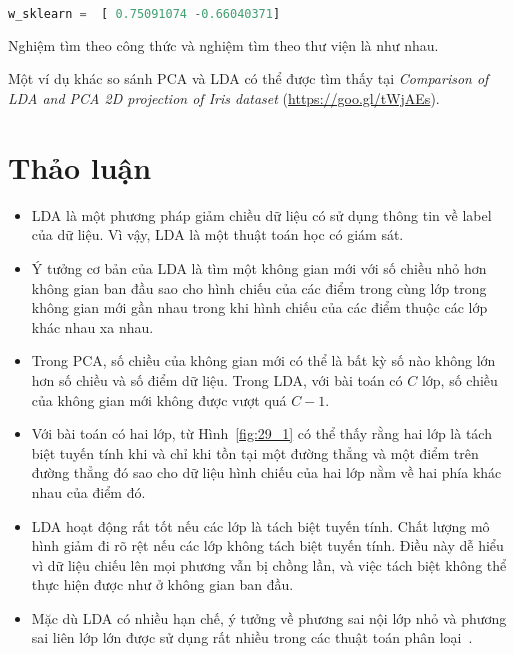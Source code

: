 \begin{lstlisting}[language=Python]
w_sklearn =  [ 0.75091074 -0.66040371]
\end{lstlisting}
 
Nghiệm tìm theo công thức và nghiệm tìm theo thư viện là như nhau. 
 
Một ví dụ khác so sánh PCA và LDA có thể được tìm thấy tại \textit{Comparison of LDA
and PCA 2D projection of Iris dataset} (\url{https://goo.gl/tWjAEs}). 
 
\newpage
\section{Thảo luận}

\begin{itemize}
    \item LDA là một phương pháp giảm chiều dữ liệu có sử dụng thông tin về
    label của dữ liệu. Vì vậy, LDA là một thuật toán học có giám sát. 
     
    \item Ý tưởng cơ bản của LDA là tìm một không gian mới với số chiều nhỏ hơn
    không gian ban đầu sao cho hình chiếu của các điểm trong cùng lớp trong không gian mới gần nhau trong khi hình chiếu của các điểm thuộc các lớp khác
    nhau xa nhau. 
     
    \item Trong PCA, số chiều của không gian mới có thể là bất kỳ số nào không lớn hơn số chiều và số điểm dữ liệu. Trong LDA, với bài toán có $C$
    lớp, số chiều của không gian mới không được vượt quá $C-1$.
     
    \item Với bài toán có hai lớp, từ Hình~\ref{fig:29_1} có thể thấy rằng
    hai lớp
    là tách biệt tuyến tính khi và chỉ khi tồn tại một đường thẳng và một điểm
    trên đường thẳng đó sao cho dữ liệu hình chiếu của hai lớp nằm về hai phía khác nhau của điểm đó.
     
    \item LDA hoạt động rất tốt nếu các lớp là tách biệt tuyến tính. Chất lượng mô
    hình giảm đi rõ rệt nếu các lớp không tách biệt tuyến tính. Điều này dễ
    hiểu vì dữ liệu chiếu lên mọi phương vẫn bị chồng lần, và việc
    tách biệt không thể thực hiện được như ở không gian ban đầu.
     
    \item Mặc dù LDA có nhiều hạn chế, ý tưởng về phương sai nội lớp nhỏ và phương sai liên lớp lớn được sử dụng rất nhiều trong các
    thuật toán phân loại~\cite{vu2016fast,vu2016learning,Meng2011FDDL}.
 
\end{itemize}
 
